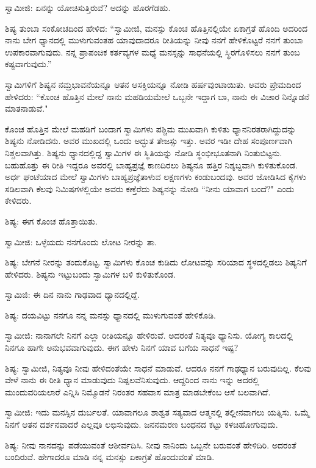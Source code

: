 ಸ್ವಾಮೀಜಿ: ಏನನ್ನು ಯೋಚಿಸುತ್ತಿರುವೆ? ಅದನ್ನು ಹೊರಗೆಡಹು.

ಶಿಷ್ಯ ತುಂಬಾ ಸಂಕೋಚದಿಂದ ಹೇಳಿದ: “ಸ್ವಾಮೀಜಿ, ಮನಸ್ಸು ಕೊಂಚ ಹೊತ್ತಿನಲ್ಲಿಯೇ ಏಕಾಗ್ರತೆ ಹೊಂದಿ ಅದರಿಂದ ನಾನು ಬೇಗ ಧ್ಯಾನದಲ್ಲಿ ಮುಳುಗುವಂತಹ ಯಾವುದಾದರೂ ರೀತಿಯನ್ನು ನೀವು ನನಗೆ ಹೇಳಿಕೊಟ್ಟರೆ ನನಗೆ ತುಂಬಾ ಉಪಕಾರವಾಗುವುದು. ನನ್ನ ಪ್ರಾಪಂಚಿಕ ಕರ್ತವ್ಯಗಳ ಮಧ್ಯೆ ಮನಸ್ಸನ್ನು ಸಾಧನೆಯಲ್ಲಿ ಸ್ಥಿರಗೊಳಿಸಲು ನನಗೆ ತುಂಬ ಕಷ್ಟವಾಗುವುದು.”

ಸ್ವಾಮಿಗಳಿಗೆ ಶಿಷ್ಯನ ನಮ್ರಭಾವನೆಯನ್ನೂ ಆತನ ಆಸಕ್ತಿಯನ್ನೂ ನೋಡಿ ಹರ್ಷವುಂಟಾಯಿತು. ಅವರು ಪ್ರೇಮದಿಂದ ಹೇಳಿದರು: “ಕೊಂಚ ಹೊತ್ತಿನ ಮೇಲೆ ನಾನು ಮಹಡಿಯಮೇಲೆ ಒಬ್ಬನೇ ಇದ್ದಾಗ ಬಾ, ನಾನು ಈ ವಿಚಾರ ನಿನ್ನೊಡನೆ ಮಾತನಾಡುವೆ."

ಕೊಂಚ ಹೊತ್ತಿನ ಮೇಲೆ ಮಹಡಿಗೆ ಬಂದಾಗ ಸ್ವಾಮಿಗಳು ಪಶ್ಚಿಮ ಮುಖವಾಗಿ ಕುಳಿತು ಧ್ಯಾನನಿರತರಾಗಿದ್ದುದನ್ನು ಶಿಷ್ಯನು ನೋಡಿದನು. ಅವರ ಮುಖದಲ್ಲಿ ಒಂದು ಅದ್ಭುತ ತೇಜಸ್ಸು ಇತ್ತು. ಅವರ ಇಡೀ ದೇಹ ಸಂಪೂರ್ಣವಾಗಿ ನಿಶ್ಚಲವಾಗಿತ್ತು. ಶಿಷ್ಯನು ಧ್ಯಾನದಲ್ಲಿದ್ದ ಸ್ವಾಮಿಗಳ ಈ ಸ್ಥಿತಿಯನ್ನು ನೋಡಿ ಸ್ಥಂಭೀಭೂತನಾಗಿ ನಿಂತುಬಿಟ್ಟನು. ಬಹುಹೊತ್ತು ಈ ರೀತಿ ಇದ್ದರೂ ಅವರಲ್ಲಿ ಬಾಹ್ಯಪ್ರಜ್ಞೆ ಕಾಣದಿರಲು ಶಿಷ್ಯನೂ ಹತ್ತಿರ ನಿಶ್ಶಬ್ದವಾಗಿ ಕುಳಿತುಕೊಂಡ. ಅರ್ಧ ಘಂಟೆಯಾದ ಮೇಲೆ ಸ್ವಾಮಿಗಳು ಬಾಹ್ಯಪ್ರಜ್ಞೆತಾಳುವ ಲಕ್ಷಣಗಳು ಕಂಡುಬಂದವು. ಅವರ ಜೋಡಿಸಿದ ಕೈಗಳು ಸಡಿಲವಾಗಿ ಕೆಲವು ನಿಮಿಷಗಳಲ್ಲಿಯೇ ಅವರು ಕಣ್ತೆರೆದು ಶಿಷ್ಯನನ್ನು ನೋಡಿ “ನೀನು ಯಾವಾಗ ಬಂದೆ?" ಎಂದು ಕೇಳಿದರು.

ಶಿಷ್ಯ: ಈಗ ಕೊಂಚ ಹೊತ್ತಾಯಿತು.

ಸ್ವಾಮೀಜಿ: ಒಳ್ಳೆಯದು ನನಗೊಂದು ಲೋಟ ನೀರನ್ನು ತಾ.

ಶಿಷ್ಯ: ಬೇಗನೆ ನೀರನ್ನು ತಂದುಕೊಟ್ಟ. ಸ್ವಾಮಿಗಳು ಕೊಂಚ ಕುಡಿದು ಲೋಟವನ್ನು ಸರಿಯಾದ ಸ್ಥಳದಲ್ಲಿಡಲು ಶಿಷ್ಯನಿಗೆ ಹೇಳಿದರು. ಶಿಷ್ಯನು ಇಟ್ಟುಬಂದು ಸ್ವಾಮಿಗಳ ಬಳಿ ಕುಳಿತುಕೊಂಡ.

ಸ್ವಾಮಿಜಿ: ಈ ದಿನ ನಾನು ಗಾಢವಾದ ಧ್ಯಾನದಲ್ಲಿದ್ದೆ.

ಶಿಷ್ಯ: ದಯವಿಟ್ಟು ನನಗೂ ನನ್ನ ಮನಸ್ಸು ಧ್ಯಾನದಲ್ಲಿ ಮುಳುಗುವಂತೆ ಹೇಳಿಕೊಡಿ.

ಸ್ವಾಮೀಜಿ: ನಾನಾಗಲೇ ನಿನಗೆ ಎಲ್ಲಾ ರೀತಿಯನ್ನೂ ಹೇಳಿರುವೆ. ಅದರಂತೆ ನಿತ್ಯವೂ ಧ್ಯಾನಿಸು. ಯೋಗ್ಯ ಕಾಲದಲ್ಲಿ ನಿನಗೂ ಹಾಗೇ ಅನುಭವವಾಗುವುದು. ಈಗ ಹೇಳು ನಿನಗೆ ಯಾವ ಬಗೆಯ ಸಾಧನೆ ಇಷ್ಟ?

ಶಿಷ್ಯ: ಸ್ವಾಮೀಜಿ, ನಿತ್ಯವೂ ನೀವು ಹೇಳಿದಂತೆಯೇ ಸಾಧನೆ ಮಾಡುವೆ. ಆದರೂ ನನಗೆ ಗಾಢಧ್ಯಾನ ಬರುವುದಿಲ್ಲ. ಕೆಲವು ವೇಳೆ ನಾನು ಈ ರೀತಿ ಧ್ಯಾನ ಮಾಡುವುದು ನಿಷ್ಪಲವೆನಿಸುವುದು. ಆದ್ದರಿಂದ ನಾನು ಇನ್ನು ಅದರಲ್ಲಿ ಮುಂದುವರಿಯಲಾರೆ ಎನ್ನಿಸಿ ನಿಮ್ಮೊಡನೆ ನಿರಂತರ ಸಹವಾಸ ಮಾತ್ರ ಮಾಡಬೇಕೆಂಬ ಆಸೆ ಬಲವಾಗಿದೆ.

ಸ್ವಾಮೀಜಿ: ಇದು ಮನಸ್ಸಿನ ದುರ್ಬಲತೆ. ಯಾವಾಗಲೂ ಶಾಶ್ವತ ಸತ್ಯವಾದ ಆತ್ಮನಲ್ಲಿ ತಲ್ಲೀನವಾಗಲು ಯತ್ನಿಸು. ಒಮ್ಮೆ ನಿನಗೆ ಆತನ ದರ್ಶನವಾದರೆ ಎಲ್ಲವೂ ಲಭಿಸುವುದು. ಜನನಮರಣ ಬಂಧನದ ಕಟ್ಟು ಕಳಚಿಹೋಗುವುದು.

ಶಿಷ್ಯ: ನೀವು ನಾನದನ್ನು ಪಡೆಯುವಂತೆ ಆಶೀರ್ವದಿಸಿ. ನೀವು ನಾನಿಂದು ಒಬ್ಬನೇ ಬರುವಂತೆ ಹೇಳಿದಿರಿ. ಅದರಂತೆ ಬಂದಿರುವೆ. ಹೇಗಾದರೂ ಮಾಡಿ ನನ್ನ ಮನಸ್ಸು ಏಕಾಗ್ರತೆ ಹೊಂದುವಂತೆ ಮಾಡಿ.

